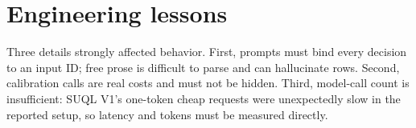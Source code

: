 \section{Engineering lessons}
Three details strongly affected behavior. First, prompts must bind every decision
to an input ID; free prose is difficult to parse and can hallucinate rows. Second,
calibration calls are real costs and must not be hidden. Third, model-call count is
insufficient: SUQL V1's one-token cheap requests were unexpectedly slow in the
reported setup, so latency and tokens must be measured directly.
